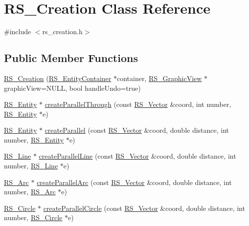 \hypertarget{classRS__Creation}{\section{R\-S\-\_\-\-Creation Class Reference}
\label{classRS__Creation}
}


{\ttfamily \#include $<$rs\-\_\-creation.\-h$>$}

\subsection*{Public Member Functions}
\begin{DoxyCompactItemize}
\item 
\hyperlink{classRS__Creation_a2b60879cec65b84a4c05d77954078b2f}{R\-S\-\_\-\-Creation} (\hyperlink{classRS__EntityContainer}{R\-S\-\_\-\-Entity\-Container} $\ast$container, \hyperlink{classRS__GraphicView}{R\-S\-\_\-\-Graphic\-View} $\ast$graphic\-View=N\-U\-L\-L, bool handle\-Undo=true)
\item 
\hyperlink{classRS__Entity}{R\-S\-\_\-\-Entity} $\ast$ \hyperlink{classRS__Creation_a1f16b55bc8bac7d69e49ff8957f18078}{create\-Parallel\-Through} (const \hyperlink{classRS__Vector}{R\-S\-\_\-\-Vector} \&coord, int number, \hyperlink{classRS__Entity}{R\-S\-\_\-\-Entity} $\ast$e)
\item 
\hyperlink{classRS__Entity}{R\-S\-\_\-\-Entity} $\ast$ \hyperlink{classRS__Creation_ad19bdd11f779a463d27b4d8ba4730685}{create\-Parallel} (const \hyperlink{classRS__Vector}{R\-S\-\_\-\-Vector} \&coord, double distance, int number, \hyperlink{classRS__Entity}{R\-S\-\_\-\-Entity} $\ast$e)
\item 
\hyperlink{classRS__Line}{R\-S\-\_\-\-Line} $\ast$ \hyperlink{classRS__Creation_ac9c89ff92139704670f10a0059b5c356}{create\-Parallel\-Line} (const \hyperlink{classRS__Vector}{R\-S\-\_\-\-Vector} \&coord, double distance, int number, \hyperlink{classRS__Line}{R\-S\-\_\-\-Line} $\ast$e)
\item 
\hyperlink{classRS__Arc}{R\-S\-\_\-\-Arc} $\ast$ \hyperlink{classRS__Creation_a99e3754dd9fa25c021bf568ccdd9e902}{create\-Parallel\-Arc} (const \hyperlink{classRS__Vector}{R\-S\-\_\-\-Vector} \&coord, double distance, int number, \hyperlink{classRS__Arc}{R\-S\-\_\-\-Arc} $\ast$e)
\item 
\hyperlink{classRS__Circle}{R\-S\-\_\-\-Circle} $\ast$ \hyperlink{classRS__Creation_a5880201645fc6af26827fc89818e8fc0}{create\-Parallel\-Circle} (const \hyperlink{classRS__Vector}{R\-S\-\_\-\-Vector} \&coord, double distance, int number, \hyperlink{classRS__Circle}{R\-S\-\_\-\-Circle} $\ast$e)

\end{DoxyCompactItemize}
